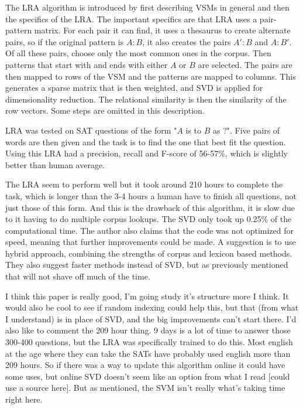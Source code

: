 \documentclass[10pt]{article}
\begin{document}
\begin{review}
    The LRA algorithm is introduced by first describing VSMs in general and then the specifics of the LRA.
    The important specifics are that LRA uses a pair-pattern matrix.
    For each pair it can find, it uses a thesaurus to create alternate pairs, so if the original pattern is $A : B$, it also creates the pairs $A' : B$ and $A : B'$.
    Of all these pairs, choose only the most common ones in the corpus.
    Then patterns that start with and ends with either $A$ or $B$ are selected.
    The pairs are then mapped to rows of the VSM and the patterns are mapped to columns.
    This generates a sparse matrix that is then weighted, and SVD is applied for dimensionality reduction.
    The relational similarity is then the similarity of the row vectors.
    Some steps are omitted in this description.
    
    LRA was tested on SAT questions of the form "$A$ is to $B$ as ?".
    Five pairs of words are then given and the task is to find the one that best fit the question.
    Using this LRA had a precision, recall and F-score of 56-57\%, which is slightly better than human average.
    
    The LRA seem to perform well but it took around 210 hours to complete the task, which is longer than the 3-4 hours a human have to finish all questions, not just those of this form.
    And this is the drawback of this algorithm, it is slow due to it having to do multiple corpus lookups.
    The SVD only took up 0.25\% of the computational time.
    The author also claims that the code was not optimized for speed, meaning that further improvements could be made.
    A suggestion is to use hybrid approach, combining the strengths of corpus and lexicon based methods.
    They also suggest faster methods instead of SVD, but as previously mentioned that will not shave off much of the time.
    
    I think this paper is really good, I'm going study it's structure more I think.
    It would also be cool to see if random indexing could help this, but that (from what I understand) is in place of SVD, and the big improvements can't start there.
    I'd also like to comment the 209 hour thing.
    9 days is a lot of time to answer those 300-400 questions, but the LRA was specifically trained to do this.
    Most english at the age where they can take the SATs have probably used english more than 209 hours.
    So if there was a way to update this algorithm online it could have some uses, but online SVD doesn't seem like an option from what I read [could use a source here].
    But as mentioned, the SVM isn't really what's taking time right here.
    
\end{review}
\end{document}
